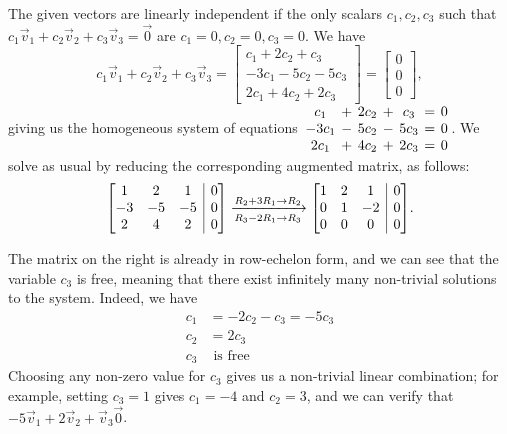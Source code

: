 \documentclass[12pt]{article}
\makeatletter
\newcommand{\bbm}{\begin{bmatrix}}
\newcommand{\ebm}{\end{bmatrix}}
\newenvironment{amatrix}[1]{%
  \left[\begin{array}{@{}*{#1}{c}|c@{}}
}{%
  \end{array}\right]
}
\newcommand{\bam}{\begin{amatrix}}
\newcommand{\eam}{\end{amatrix}}
\makeatother
\begin{document}
\begin{enumerate}
\begin{enumerate}
\bigskip

The given vectors are linearly independent if the only scalars $c_1, c_2, c_3$ such that $c_1\vec{v}_1+c_2\vec{v}_2+c_3\vec{v}_3=\vec{0}$ are $c_1=0, c_2=0, c_3=0$. We have
\[
 c_1\vec{v}_1+c_2\vec{v}_2+c_3\vec{v}_3 = \bbm c_1+2c_2+c_3\\-3c_1-5c_2-5c_3\\2c_1+4c_2+2c_3\ebm = \bbm 0\\0\\0\ebm,
\]
giving us the homogeneous system of equations $\arraycolsep=2pt\begin{array}{ccccccc}
                                                     c_1&+&2c_2&+&c_3&=&0\\-3c_1&-&5c_2&-&5c_3&=&0\\2c_1&+&4c_2&+&2c_3&=&0
                                                   \end{array}$. We solve as usual by reducing the corresponding augmented matrix, as follows:
\[
 \bam{3}1&2&1&0\\-3&-5&-5&0\\2&4&2&0\eam \xrightarrow[R_3-2R_1\to R_3]{R_2+3R_1\to R_2} \bam{3}1&2&1&0\\0&1&-2&0\\0&0&0&0\eam.
\]

The matrix on the right is already in row-echelon form, and we can see that the variable $c_3$ is free, meaning that there exist infinitely many non-trivial solutions to the system. Indeed, we have
\begin{align*}
 c_1& =-2c_2-c_3= -5c_3\\
 c_2& = 2c_3\\
 c_3& \text{ is free}
\end{align*}
Choosing any non-zero value for $c_3$ gives us a non-trivial linear combination; for example, setting $c_3=1$ gives $c_1=-4$ and $c_2=3$, and we can verify that $ -5\vec{v}_1+2\vec{v}_2+\vec{v}_3\vec{0}$.


\end{enumerate}


\end{enumerate}
\end{document}
